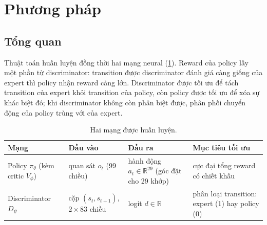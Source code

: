 \documentclass[11pt,a4paper]{article}
\newcommand{\R}{\mathbb{R}}
\begin{document}
\section{Phương pháp}
\subsection{Tổng quan}
Thuật toán huấn luyện đồng thời hai mạng neural (\cref{tab:nets}). Reward của policy
lấy một phần từ discriminator: transition được discriminator đánh giá càng giống của
expert thì policy nhận reward càng lớn. Discriminator được tối ưu để tách transition của
expert khỏi transition của policy, còn policy được tối ưu để xóa sự khác biệt đó; khi
discriminator không còn phân biệt được, phân phối chuyển động của policy trùng với của
expert.

\begin{table}[H]
\centering
\caption{Hai mạng được huấn luyện.}
\label{tab:nets}
\small
\begin{tabular}{@{}p{3.2cm}p{3.6cm}p{3.1cm}p{4.3cm}@{}}
\toprule
Mạng & Đầu vào & Đầu ra & Mục tiêu tối ưu \\
\midrule
Policy $\pi_\theta$ (kèm critic $V_\phi$) & quan sát $o_t$ (99 chiều) & hành động
$a_t \in \R^{29}$ (góc đặt cho 29 khớp) & cực đại tổng reward có chiết khấu \\
Discriminator $D_\psi$ & cặp $(s_t, s_{t+1})$, $2 \times 83$ chiều & logit $d \in \R$ &
phân loại transition: expert (1) hay policy (0) \\
\bottomrule
\end{tabular}
\end{table}
\end{document}

